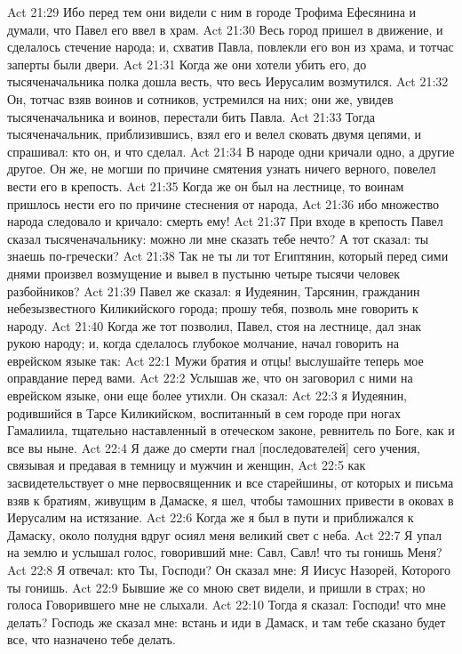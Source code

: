 Act 21:29  Ибо перед тем они видели с ним в городе Трофима Ефесянина и думали, что Павел его ввел в храм.
Act 21:30  Весь город пришел в движение, и сделалось стечение народа; и, схватив Павла, повлекли его вон из храма, и тотчас заперты были двери.
Act 21:31  Когда же они хотели убить его, до тысяченачальника полка дошла весть, что весь Иерусалим возмутился.
Act 21:32  Он, тотчас взяв воинов и сотников, устремился на них; они же, увидев тысяченачальника и воинов, перестали бить Павла.
Act 21:33  Тогда тысяченачальник, приблизившись, взял его и велел сковать двумя цепями, и спрашивал: кто он, и что сделал.
Act 21:34  В народе одни кричали одно, а другие другое. Он же, не могши по причине смятения узнать ничего верного, повелел вести его в крепость.
Act 21:35  Когда же он был на лестнице, то воинам пришлось нести его по причине стеснения от народа,
Act 21:36  ибо множество народа следовало и кричало: смерть ему!
Act 21:37  При входе в крепость Павел сказал тысяченачальнику: можно ли мне сказать тебе нечто? А тот сказал: ты знаешь по-гречески?
Act 21:38  Так не ты ли тот Египтянин, который перед сими днями произвел возмущение и вывел в пустыню четыре тысячи человек разбойников?
Act 21:39  Павел же сказал: я Иудеянин, Тарсянин, гражданин небезызвестного Киликийского города; прошу тебя, позволь мне говорить к народу.
Act 21:40  Когда же тот позволил, Павел, стоя на лестнице, дал знак рукою народу; и, когда сделалось глубокое молчание, начал говорить на еврейском языке так:
Act 22:1  Мужи братия и отцы! выслушайте теперь мое оправдание перед вами.
Act 22:2  Услышав же, что он заговорил с ними на еврейском языке, они еще более утихли. Он сказал:
Act 22:3  я Иудеянин, родившийся в Тарсе Киликийском, воспитанный в сем городе при ногах Гамалиила, тщательно наставленный в отеческом законе, ревнитель по Боге, как и все вы ныне.
Act 22:4  Я даже до смерти гнал [последователей] сего учения, связывая и предавая в темницу и мужчин и женщин,
Act 22:5  как засвидетельствует о мне первосвященник и все старейшины, от которых и письма взяв к братиям, живущим в Дамаске, я шел, чтобы тамошних привести в оковах в Иерусалим на истязание.
Act 22:6  Когда же я был в пути и приближался к Дамаску, около полудня вдруг осиял меня великий свет с неба.
Act 22:7  Я упал на землю и услышал голос, говоривший мне: Савл, Савл! что ты гонишь Меня?
Act 22:8  Я отвечал: кто Ты, Господи? Он сказал мне: Я Иисус Назорей, Которого ты гонишь.
Act 22:9  Бывшие же со мною свет видели, и пришли в страх; но голоса Говорившего мне не слыхали.
Act 22:10  Тогда я сказал: Господи! что мне делать? Господь же сказал мне: встань и иди в Дамаск, и там тебе сказано будет все, что назначено тебе делать.
